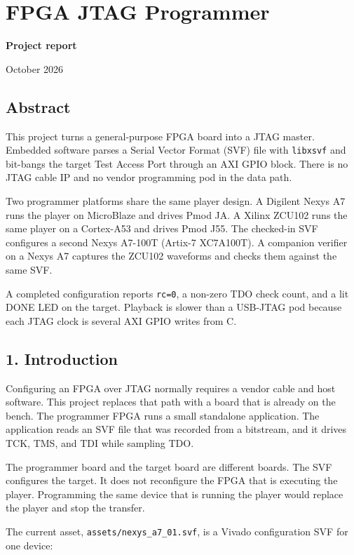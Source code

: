 \documentclass[
  11pt,
  a4paper,
]{article}
\author{}
\date{}
\begin{document}
\section{FPGA JTAG Programmer}\label{fpga-jtag-programmer}

\textbf{Project report}

October 2026

\subsection{Abstract}\label{abstract}

This project turns a general-purpose FPGA board into a JTAG master.
Embedded software parses a Serial Vector Format (SVF) file with
\texttt{libxsvf} and bit-bangs the target Test Access Port through an
AXI GPIO block. There is no JTAG cable IP and no vendor programming pod
in the data path.

Two programmer platforms share the same player design. A Digilent Nexys
A7 runs the player on MicroBlaze and drives Pmod JA. A Xilinx ZCU102
runs the same player on a Cortex-A53 and drives Pmod J55. The checked-in
SVF configures a second Nexys A7-100T (Artix-7 XC7A100T). A companion
verifier on a Nexys A7 captures the ZCU102 waveforms and checks them
against the same SVF.

A completed configuration reports \texttt{rc=0}, a non-zero TDO check
count, and a lit DONE LED on the target. Playback is slower than a
USB-JTAG pod because each JTAG clock is several AXI GPIO writes from C.

\subsection{1. Introduction}\label{introduction}

Configuring an FPGA over JTAG normally requires a vendor cable and host
software. This project replaces that path with a board that is already
on the bench. The programmer FPGA runs a small standalone application.
The application reads an SVF file that was recorded from a bitstream,
and it drives TCK, TMS, and TDI while sampling TDO.

The programmer board and the target board are different boards. The SVF
configures the target. It does not reconfigure the FPGA that is
executing the player. Programming the same device that is running the
player would replace the player and stop the transfer.

The current asset, \texttt{assets/nexys\_a7\_01.svf}, is a Vivado
configuration SVF for one device:
\end{document}
